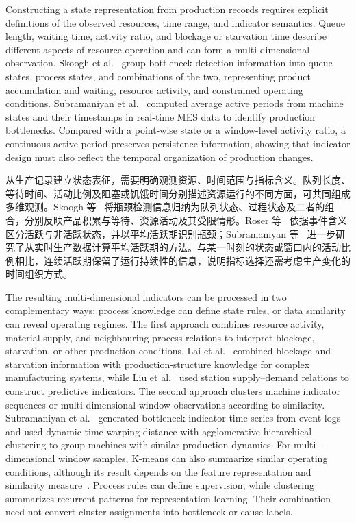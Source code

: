 \documentclass[a4paper,fleqn]{cas-dc}
\newcommand{\zhpara}[1]{%
  \par\begingroup\small\color{black!72}\noindent #1\par\endgroup}
\begin{document}
Constructing a state representation from production records requires explicit definitions of the observed resources, time range, and indicator semantics. Queue length, waiting time, activity ratio, and blockage or starvation time describe different aspects of resource operation and can form a multi-dimensional observation. Skoogh et al.~\cite{subramaniyan2023throughput} group bottleneck-detection information into queue states, process states, and combinations of the two, representing product accumulation and waiting, resource activity, and constrained operating conditions. Subramaniyan et al.~\cite{subramaniyan2016realtime} computed average active periods from machine states and their timestamps in real-time MES data to identify production bottlenecks. Compared with a point-wise state or a window-level activity ratio, a continuous active period preserves persistence information, showing that indicator design must also reflect the temporal organization of production changes.

\zhpara{从生产记录建立状态表征，需要明确观测资源、时间范围与指标含义。队列长度、等待时间、活动比例及阻塞或饥饿时间分别描述资源运行的不同方面，可共同组成多维观测。Skoogh 等~\cite{subramaniyan2023throughput} 将瓶颈检测信息归纳为队列状态、过程状态及二者的组合，分别反映产品积累与等待、资源活动及其受限情形。Roser 等~\cite{roser2001practical} 依据事件含义区分活跃与非活跃状态，并以平均活跃期识别瓶颈；Subramaniyan 等~\cite{subramaniyan2016realtime} 进一步研究了从实时生产数据计算平均活跃期的方法。与某一时刻的状态或窗口内的活动比例相比，连续活跃期保留了运行持续性的信息，说明指标选择还需考虑生产变化的时间组织方式。}


The resulting multi-dimensional indicators can be processed in two complementary ways: process knowledge can define state rules, or data similarity can reveal operating regimes. The first approach combines resource activity, material supply, and neighbouring-process relations to interpret blockage, starvation, or other production conditions. Lai et al.~\cite{lai2021data} combined blockage and starvation information with production-structure knowledge for complex manufacturing systems, while Liu et al.~\cite{liu2023lstmdam} used station supply--demand relations to construct predictive indicators. The second approach clusters machine indicator sequences or multi-dimensional window observations according to similarity. Subramaniyan et al.~\cite{subramaniyan2020clustering} generated bottleneck-indicator time series from event logs and used dynamic-time-warping distance with agglomerative hierarchical clustering to group machines with similar production dynamics. For multi-dimensional window samples, K-means can also summarize similar operating conditions, although its result depends on the feature representation and similarity measure~\cite{jain2010clustering}. Process rules can define supervision, while clustering summarizes recurrent patterns for representation learning. Their combination need not convert cluster assignments into bottleneck or cause labels.
\end{document}
